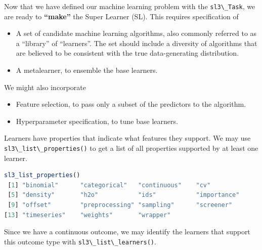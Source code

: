 \documentclass[12pt, krantz2,]{krantz}
\newcommand{\passthrough}[1]{#1}
\providecommand{\tightlist}{%
  \setlength{\itemsep}{0pt}\setlength{\parskip}{0pt}}
\theoremstyle{definition}
\theoremstyle{definition}
\theoremstyle{definition}
\newcommand{\1}{\mathbbm{1}}
\begin{document}
Now that we have defined our machine learning problem with the \passthrough{\lstinline!sl3\_Task!}, we
are ready to \textbf{``make''} the Super Learner (SL). This requires specification of

\begin{itemize}
\tightlist
\item
  A set of candidate machine learning algorithms, also commonly referred to as
  a ``library'' of ``learners''. The set should include a diversity of algorithms
  that are believed to be consistent with the true data-generating
  distribution.
\item
  A metalearner, to ensemble the base learners.
\end{itemize}

We might also incorporate

\begin{itemize}
\tightlist
\item
  Feature selection, to pass only a subset of the predictors to the algorithm.
\item
  Hyperparameter specification, to tune base learners.
\end{itemize}

Learners have properties that indicate what features they support. We may use
\passthrough{\lstinline!sl3\_list\_properties()!} to get a list of all properties supported by at least
one learner.

\begin{lstlisting}[language=R]
sl3_list_properties()
 [1] "binomial"      "categorical"   "continuous"    "cv"           
 [5] "density"       "h2o"           "ids"           "importance"   
 [9] "offset"        "preprocessing" "sampling"      "screener"     
[13] "timeseries"    "weights"       "wrapper"      
\end{lstlisting}

Since we have a continuous outcome, we may identify the learners that support
this outcome type with \passthrough{\lstinline!sl3\_list\_learners()!}.
\end{document}
